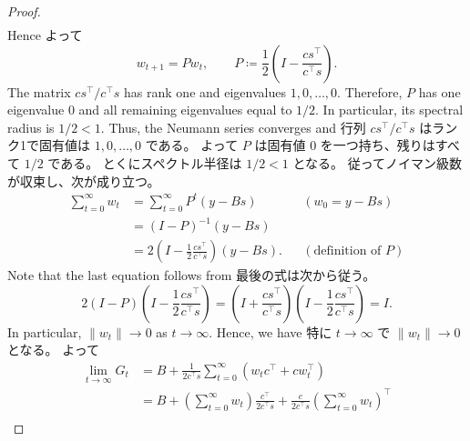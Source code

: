 \documentclass[0_main]{subfiles}
\begin{document}
\begin{proof}
\begin{align*}
    \end{align*}
    \ifEn
        Hence
    \else
        よって
    \fi
    \begin{equation*}
        w_{t+1}=Pw_t,
        \qquad
        P \coloneqq \frac{1}{2}\left(I-\frac{cs^\top}{c^\top s}\right).
    \end{equation*}
    \ifEn
        The matrix $cs^\top/c^\top s$ has rank one and eigenvalues $1,0,\dots,0$.
        Therefore, $P$ has one eigenvalue $0$ and all remaining eigenvalues equal to $1/2$.
        In particular, its spectral radius is $1/2<1$.
        Thus, the Neumann series converges and
    \else
        行列 $cs^\top/c^\top s$ はランク1で固有値は $1,0,\dots,0$ である。
        よって $P$ は固有値 $0$ を一つ持ち、残りはすべて $1/2$ である。
        とくにスペクトル半径は $1/2<1$ となる。
        従ってノイマン級数が収束し、次が成り立つ。
    \fi
    \begin{align*}
        \sum_{t=0}^{\infty}w_t & =        \sum_{t=0}^{\infty}P^t(y-Bs)                         &  & (w_0=y-Bs)                \\
                               & =  (I-P)^{-1}(y-Bs)                                                                          \\
                               & = 2\left(I-\frac{1}{2}\frac{cs^\top}{c^\top s}\right) (y-Bs). &  & (\text{definition of } P)
    \end{align*}
    \ifEn
        Note that the last equation follows from
    \else
        最後の式は次から従う。
    \fi
    \begin{equation*}
        2(I-P) \left(I-\frac{1}{2}\frac{cs^\top}{c^\top s}\right) = \left(I + \frac{cs^\top}{c^\top s}\right) \left(I-\frac{1}{2}\frac{cs^\top}{c^\top s}\right) = I.
    \end{equation*}
    \ifEn
        In particular, $\lVert w_t \rVert\to0$ as $t\to\infty$.
        Hence, we have
    \else
        特に $t\to\infty$ で $\lVert w_t \rVert\to0$ となる。
        よって
    \fi
    \begin{align*}
        \lim_{t\to\infty}G_t
         & =
        B+\frac{1}{2c^\top s}
        \sum_{t=0}^{\infty}(w_t c^\top+c w_t^\top)                                                                                                                                        \\
         & = B+ \left(\sum_{t=0}^{\infty}w_t\right) \frac{c^\top}{2c^\top s} + \frac{c}{2c^\top s} \left(\sum_{t=0}^{\infty}w_t\right)^\top                                               \\

\end{align*}
\end{proof}
\end{document}
